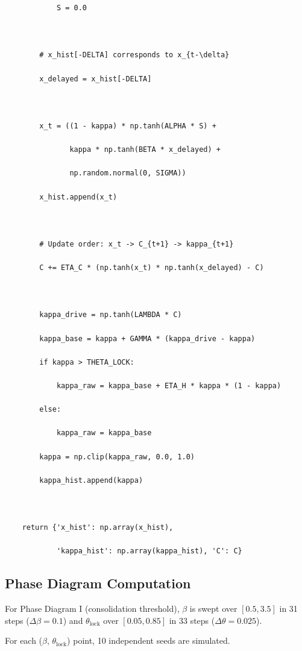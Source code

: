 \documentclass[12pt,a4paper]{article}
\begin{document}
{\begin{verbatim}
            S = 0.0



        # x_hist[-DELTA] corresponds to x_{t-\delta}

        x_delayed = x_hist[-DELTA]



        x_t = ((1 - kappa) * np.tanh(ALPHA * S) +

               kappa * np.tanh(BETA * x_delayed) +

               np.random.normal(0, SIGMA))

        x_hist.append(x_t)



        # Update order: x_t -> C_{t+1} -> kappa_{t+1}

        C += ETA_C * (np.tanh(x_t) * np.tanh(x_delayed) - C)



        kappa_drive = np.tanh(LAMBDA * C)

        kappa_base = kappa + GAMMA * (kappa_drive - kappa)

        if kappa > THETA_LOCK:

            kappa_raw = kappa_base + ETA_H * kappa * (1 - kappa)

        else:

            kappa_raw = kappa_base

        kappa = np.clip(kappa_raw, 0.0, 1.0)

        kappa_hist.append(kappa)



    return {'x_hist': np.array(x_hist),

            'kappa_hist': np.array(kappa_hist), 'C': C}

\end{verbatim}

}



\subsection{Phase Diagram Computation}



For Phase Diagram I (consolidation threshold), $\beta$ is swept over $[0.5, 3.5]$ in 31 steps ($\Delta\beta = 0.1$) and $\theta_{\mathrm{lock}}$ over $[0.05, 0.85]$ in 33 steps ($\Delta\theta = 0.025$).

For each ($\beta$, $\theta_{\mathrm{lock}}$) point, 10 independent seeds are simulated.
\end{document}
